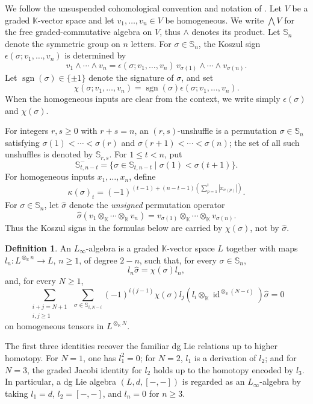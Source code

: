 \documentclass[11pt,a4paper,reqno]{amsart}
\newcommand{\mK}{\mathbb K}
\newcommand{\mS}{\mathbb S}
\newcommand{\id}{\operatorname{id}}
\newcommand{\sgn}{\operatorname{sgn}}
\theoremstyle{plain}
\theoremstyle{definition}
\newtheorem{definition}[definition]{Definition}
\numberwithin{equation}{section}
\begin{document}
	We follow the unsuspended cohomological convention and notation of
	\cite[Section~2]{RR22}. Let $V$ be a
	graded $\mK$-vector space and let $v_1,\dots,v_n\in V$ be homogeneous. We
	write $\bigwedge V$ for the free graded-commutative algebra on $V$, thus
	$\wedge$ denotes its product. Let $\mS_n$ denote the symmetric
	group on $n$ letters. For $\sigma\in\mS_n$, the Koszul sign
	$\epsilon(\sigma;v_1,\dots,v_n)$ is determined by
	\[
	v_1\wedge\cdots\wedge v_n
	=
	\epsilon(\sigma;v_1,\dots,v_n)\,
	v_{\sigma(1)}\wedge\cdots\wedge v_{\sigma(n)}.
	\]
	Let $\sgn(\sigma)\in\{\pm1\}$ denote the signature of $\sigma$, and set
	\[
	\chi(\sigma;v_1,\dots,v_n)
	=
	\sgn(\sigma)\epsilon(\sigma;v_1,\dots,v_n).
	\]
	When the homogeneous inputs are clear from the context, we write simply
	$\epsilon(\sigma)$ and $\chi(\sigma)$.
	
	For integers $r,s\geq0$ with $r+s=n$, an $(r,s)$-unshuffle is a permutation
	$\sigma\in\mS_n$ satisfying $\sigma(1)<\cdots<\sigma(r)$ and
	$\sigma(r+1)<\cdots<\sigma(n)$; the set of all such unshuffles is denoted by
	$\mS_{r,s}$. For $1\leq t<n$, put
	\[
	\mS_{t,n-t}^{-}=
	\{\sigma\in\mS_{t,n-t} \mid \sigma(1)<\sigma(t+1)\}.
	\]
	For homogeneous inputs $x_1,\dots,x_n$, define
	\[
	\kappa(\sigma)_t
	=(-1)^{(t-1)+(n-t-1)(\sum_{p=1}^{t}|x_{\sigma(p)}|)}.
	\]
	For $\sigma\in\mS_n$, let $\widehat\sigma$ denote the \emph{unsigned}
	permutation operator
	\[
	\widehat\sigma
	(v_1\otimes_{\mK}\cdots\otimes_{\mK}v_n)
	=
	v_{\sigma(1)}\otimes_{\mK}\cdots\otimes_{\mK}v_{\sigma(n)}.
	\]
	Thus the Koszul signs in the formulas below are carried by $\chi(\sigma)$,
	not by $\widehat\sigma$.
	
	\begin{definition}\label{def:Linfty}
		An $L_\infty$-algebra is a graded $\mK$-vector space $L$ together with maps
		$l_n:L^{\otimes_{\mK}n}\longrightarrow L$, $n\geq1$, of degree $2-n$, such
		that, for every $\sigma\in\mS_n$,
		\[
		l_n\widehat\sigma=\chi(\sigma)l_n,
		\]
		and, for every $N\geq1$,
		\[
		\sum_{\substack{i+j=N+1\\ i,j\geq1}}
		\ \sum_{\sigma\in\mS_{i,N-i}}
		(-1)^{i(j-1)}\chi(\sigma)
		l_j(l_i\otimes_{\mK}\id^{\otimes_{\mK}(N-i)})\widehat\sigma
		=0
		\]
		on homogeneous tensors in $L^{\otimes_{\mK}N}$.
	\end{definition}
	
	The first three identities recover the familiar dg Lie relations up to higher
	homotopy. For $N=1$, one has $l_1^2=0$; for $N=2$, $l_1$ is a derivation of
	$l_2$; and for $N=3$, the graded Jacobi identity for $l_2$ holds up to the
	homotopy encoded by $l_3$. In particular, a dg Lie algebra $(L,d,[-,-])$ is
	regarded as an $L_\infty$-algebra by taking $l_1=d$, $l_2=[-,-]$, and
	$l_n=0$ for $n\geq3$.
	
\end{document}
